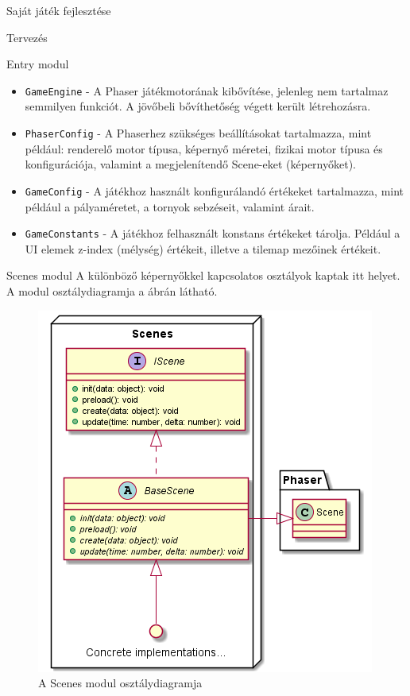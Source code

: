 \begin{MyChapter}{Saját játék fejlesztése}
\begin{MySection}{Tervezés}
\begin{MySubSection}{Entry modul}
\begin{itemize}
				\item \texttt{GameEngine} - A Phaser játékmotorának kibővítése, jelenleg nem tartalmaz semmilyen funkciót. A jövőbeli bővíthetőség végett került létrehozásra.
				
				\item \texttt{PhaserConfig} - A Phaserhez szükséges beállításokat tartalmazza, mint például: renderelő motor típusa, képernyő méretei, fizikai motor típusa és konfigurációja, valamint a megjelenítendő Scene-eket (képernyőket).
				
				\item \texttt{GameConfig} - A játékhoz használt konfigurálandó értékeket tartalmazza, mint például a pályaméretet, a tornyok sebzéseit, valamint árait.
				
				\item \texttt{GameConstants} - A játékhoz felhasznált konstans értékeket tárolja. Például a UI elemek z-index (mélység) értékeit, illetve a tilemap mezőinek értékeit.
			\end{itemize}
		\end{MySubSection}
	
		\begin{MySubSection}{Scenes modul}
			A különböző képernyőkkel kapcsolatos osztályok kaptak itt helyet.
			A modul osztálydiagramja a  ábrán látható.
			
			\begin{figure}[h!]
				\centering
				\includegraphics[scale=0.8]{kepek/uml/scenes/scene-pt1.png}
				\caption{A Scenes modul osztálydiagramja}
				\label{fig:uml:scene}
			\end{figure}
			

\end{MySubSection}
\end{MySection}
\end{MyChapter}
